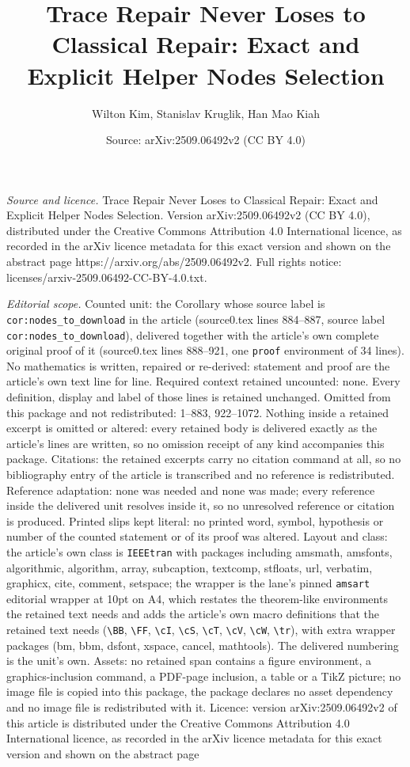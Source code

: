 \documentclass[10pt,a4paper]{amsart}
\title[Trace Repair Never Loses to Classical Repair: Exact and Expl]{Trace Repair Never Loses to Classical Repair: Exact and Explicit Helper Nodes Selection}
\author{Wilton Kim, Stanislav Kruglik, Han Mao Kiah}
\date{Source: arXiv:2509.06492v2 (CC BY 4.0)}
\begin{document}
\maketitle

\noindent\emph{Source and licence.} Trace Repair Never Loses to Classical Repair: Exact and Explicit Helper Nodes Selection. Version arXiv:2509.06492v2 (CC BY 4.0), distributed under the Creative Commons Attribution 4.0 International licence, as recorded in the arXiv licence metadata for this exact version and shown on the abstract page https://arxiv.org/abs/2509.06492v2. Full rights notice: licenses/arxiv-2509.06492-CC-BY-4.0.txt.\par\smallskip

\noindent\textit{Editorial scope.} Counted unit: the Corollary whose source label is \texttt{cor:nodes\_to\_download} in the article (source0.tex lines 884--887, source label \texttt{cor:nodes\_to\_download}), delivered together with the article's own complete original proof of it (source0.tex lines 888--921, one \texttt{proof} environment of 34 lines). No mathematics is written, repaired or re-derived: statement and proof are the article's own text line for line. Required context retained uncounted: none. Every definition, display and label of those lines is retained unchanged. Omitted from this package and not redistributed: 1--883, 922--1072. Nothing inside a retained excerpt is omitted or altered: every retained body is delivered exactly as the article's lines are written, so no omission receipt of any kind accompanies this package. Citations: the retained excerpts carry no citation command at all, so no bibliography entry of the article is transcribed and no reference is redistributed. Reference adaptation: none was needed and none was made; every reference inside the delivered unit resolves inside it, so no unresolved reference or citation is produced. Printed slips kept literal: no printed word, symbol, hypothesis or number of the counted statement or of its proof was altered. Layout and class: the article's own class is \texttt{IEEEtran} with packages including amsmath, amsfonts, algorithmic, algorithm, array, subcaption, textcomp, stfloats, url, verbatim, graphicx, cite, comment, setspace; the wrapper is the lane's pinned \texttt{amsart} editorial wrapper at 10pt on A4, which restates the theorem-like environments the retained text needs and adds the article's own macro definitions that the retained text needs (\texttt{\textbackslash BB}, \texttt{\textbackslash FF}, \texttt{\textbackslash cI}, \texttt{\textbackslash cS}, \texttt{\textbackslash cT}, \texttt{\textbackslash cV}, \texttt{\textbackslash cW}, \texttt{\textbackslash tr}), with extra wrapper packages (bm, bbm, dsfont, xspace, cancel, mathtools). The delivered numbering is the unit's own. Assets: no retained span contains a figure environment, a graphics-inclusion command, a PDF-page inclusion, a table or a TikZ picture; no image file is copied into this package, the package declares no asset dependency and no image file is redistributed with it. Licence: version arXiv:2509.06492v2 of this article is distributed under the Creative Commons Attribution 4.0 International licence, as recorded in the arXiv licence metadata for this exact version and shown on the abstract page 
\end{document}
